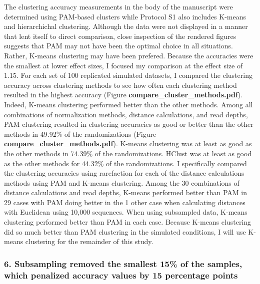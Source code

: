 \documentclass[
]{article}
\begin{document}
The clustering accuracy measurements in the body of the manuscript were
determined using PAM-based clusters while Protocol S1 also includes
K-means and hierarchichal clustering. Although the data were not
displayed in a manner that lent itself to direct comparison, close
inspection of the rendered figures suggests that PAM may not have been
the optimal choice in all situations. Rather, K-means clustering may
have been prefered. Because the accuracies were the smallest at lower
effect sizes, I focused my comparison at the effect size of 1.15. For
each set of 100 replicated simulated datasets, I compared the clustering
accuracy across clustering methods to see how often each clustering
method resulted in the highest accuracy (Figure
\textbf{compare\_cluster\_methods.pdf}). Indeed, K-means clustering
performed better than the other methods. Among all combinations of
normalization methods, distance calculations, and read depths, PAM
clustering resulted in clustering accuracies as good or better than the
other methods in 49.92\% of the randomizations (Figure
\textbf{compare\_cluster\_methods.pdf}). K-means clustering was at least
as good as the other methods in 74.39\% of the randomizations. HClust
was at least as good as the other methods for 44.32\% of the
randomizations. I specifically compared the clustering accuracies using
rarefaction for each of the distance calculations methods using PAM and
K-means clustering. Among the 30 combinations of distance calculations
and read depths, K-means performed better than PAM in 29 cases with PAM
doing better in the 1 other case when calculating distances with
Euclidean using 10,000 sequences. When using subsampled data, K-means
clustering performed better than PAM in each case. Because K-means
clustering did so much better than PAM clustering in the simulated
conditions, I will use K-means clustering for the remainder of this
study.

\hypertarget{subsampling-removed-the-smallest-15-of-the-samples-which-penalized-accuracy-values-by-15-percentage-points}{%
\subsubsection{6. Subsampling removed the smallest 15\% of the samples,
which penalized accuracy values by 15 percentage
points}\label{subsampling-removed-the-smallest-15-of-the-samples-which-penalized-accuracy-values-by-15-percentage-points}}
\end{document}
